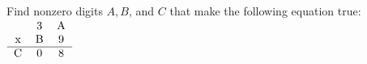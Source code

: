 Find nonzero digits $A, B$, and $C$ that make the following equation true: $\begin{tabular}{ccc}
&  3 & A \\
x & B & 9  \\
\hline
C & 0 & 8 \\
\end{tabular}$
